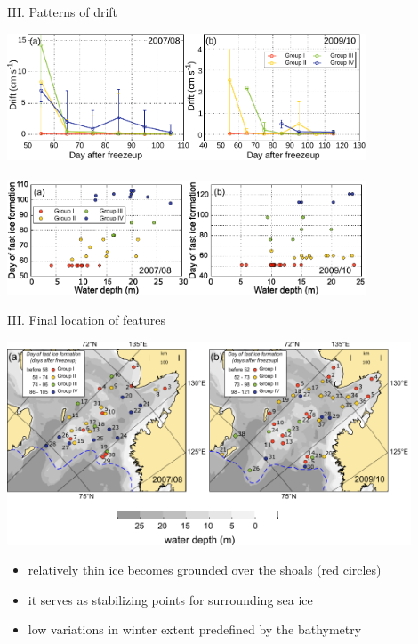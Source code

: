\documentclass[8pt]{beamer}
\begin{document}
\setwatermark{\fontsize{125pt}{125pt}\selectfont{}}
\begin{frame}[fragile]{III. Patterns of drift}
	\begin{center}
			\includegraphics[width=0.8\textwidth]{./img/groups_graph.pdf}\\~\\
			\includegraphics[width=0.8\textwidth]{./img/groups_depth.pdf}
	\end{center}
\end{frame}

\setwatermark{\fontsize{125pt}{125pt}\selectfont{}}
\begin{frame}[fragile]{III. Final location of features}
\begin{center}
	\includegraphics[width=0.9\textwidth]{./img/groups_map.pdf}
\begin{itemize}
\item relatively thin ice becomes grounded over the shoals (red circles)\\
\item it serves as stabilizing points for surrounding sea ice
\item low variations in winter extent predefined by the bathymetry
\end{itemize}
\end{center}
\end{frame}
\end{document}
